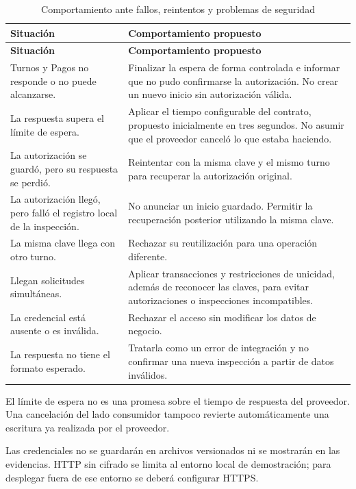 \documentclass[11pt,a4paper]{article}
\begin{document}
\begin{xltabular}{\textwidth}{L{4.2cm}X}
  \caption{Comportamiento ante fallos, reintentos y problemas de seguridad}\label{tab:fallos}\\
  \toprule
  \textbf{Situación} & \textbf{Comportamiento propuesto} \\
  \midrule
  \endfirsthead
  \toprule
  \textbf{Situación} & \textbf{Comportamiento propuesto} \\
  \midrule
  \endhead
  \bottomrule
  \endfoot
  Turnos y Pagos no responde o no puede alcanzarse. & Finalizar la espera de forma controlada e informar que no pudo confirmarse la autorización. No crear un nuevo inicio sin autorización válida. \\
  La respuesta supera el límite de espera. & Aplicar el tiempo configurable del contrato, propuesto inicialmente en tres segundos. No asumir que el proveedor canceló lo que estaba haciendo. \\
  La autorización se guardó, pero su respuesta se perdió. & Reintentar con la misma clave y el mismo turno para recuperar la autorización original. \\
  La autorización llegó, pero falló el registro local de la inspección. & No anunciar un inicio guardado. Permitir la recuperación posterior utilizando la misma clave. \\
  La misma clave llega con otro turno. & Rechazar su reutilización para una operación diferente. \\
  Llegan solicitudes simultáneas. & Aplicar transacciones y restricciones de unicidad, además de reconocer las claves, para evitar autorizaciones o inspecciones incompatibles. \\
  La credencial está ausente o es inválida. & Rechazar el acceso sin modificar los datos de negocio. \\
  La respuesta no tiene el formato esperado. & Tratarla como un error de integración y no confirmar una nueva inspección a partir de datos inválidos. \\
\end{xltabular}

El límite de espera no es una promesa sobre el tiempo de respuesta del proveedor. Una cancelación del lado consumidor tampoco revierte automáticamente una escritura ya realizada por el proveedor.

Las credenciales no se guardarán en archivos versionados ni se mostrarán en las evidencias. HTTP sin cifrado se limita al entorno local de demostración; para desplegar fuera de ese entorno se deberá configurar HTTPS.
\end{document}
